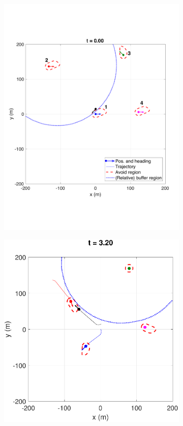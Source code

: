 \begin{figure}
\begin{subfigure}{.5\columnwidth}
  \centering
  \includegraphics[width=\columnwidth]{figs/simulate_bufferRegion_properties_worst_1}
  \subcaption{}
  \label{fig:worstcase1}
\end{subfigure}%
\begin{subfigure}{.5\columnwidth}
  \centering
  \includegraphics[width=\columnwidth]{figs/simulate_bufferRegion_properties_worst_2}

\end{subfigure}
\end{figure}
